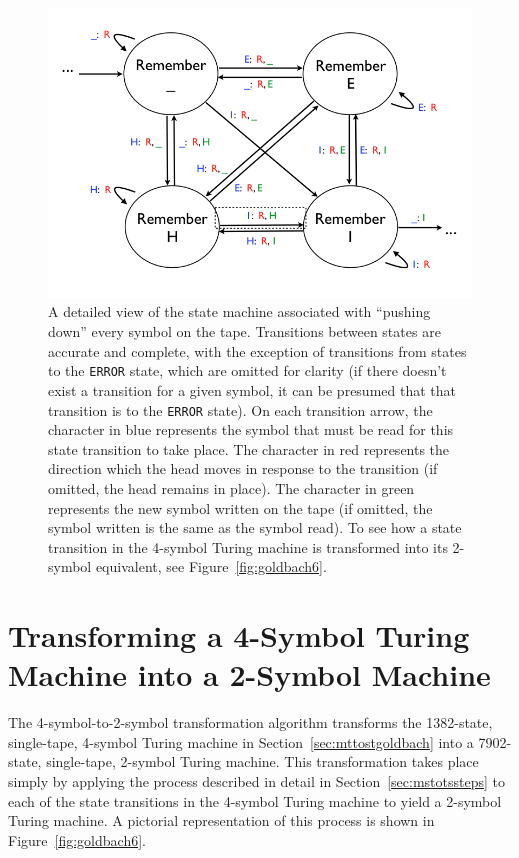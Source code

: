 \begin{figure} 
\begin{center} 
\includegraphics[scale=0.4]{figs/goldbach5.png} 
\caption{A detailed view of the state machine associated with ``pushing down'' every symbol on the tape. Transitions between states are accurate and complete, with the exception of transitions from states to the \texttt{ERROR} state, which are omitted for clarity (if there doesn't exist a transition for a given symbol, it can be presumed that that transition is to the \texttt{ERROR} state). On each transition arrow, the character in blue represents the symbol that must be read for this state transition to take place. The character in red represents the direction which the head moves in response to the transition (if omitted, the head remains in place). The character in green represents the new symbol written on the tape (if omitted, the symbol written is the same as the symbol read). To see how a state transition in the 4-symbol Turing machine is transformed into its 2-symbol equivalent, see Figure~\ref{fig:goldbach6}. \label{fig:goldbach5}}
\end{center} 
\end{figure}

\section{Transforming a 4-Symbol Turing Machine into a 2-Symbol Machine \label{sec:mstotsgoldbach}}

The 4-symbol-to-2-symbol transformation algorithm transforms the 1382-state, single-tape, 4-symbol Turing machine in Section~\ref{sec:mttostgoldbach} into a 7902-state, single-tape, 2-symbol Turing machine. This transformation takes place simply by applying the process described in detail in Section~\ref{sec:mstotssteps} to each of the state transitions in the 4-symbol Turing machine to yield a 2-symbol Turing machine. A pictorial representation of this process is shown in Figure~\ref{fig:goldbach6}.

